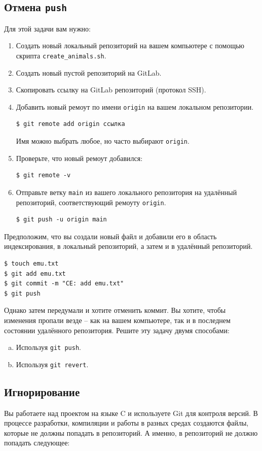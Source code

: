 \documentclass{article}
\begin{document}
\subsection{Отмена \texttt{push}}
Для этой задачи вам нужно:
\begin{enumerate}
\item Создать новый локальный репозиторий на вашем компьютере с помощью скрипта \texttt{create\_animals.sh}.
\item Создать новый пустой репозиторий на GitLab.
\item Скопировать ссылку на GitLab репозиторий (протокол SSH).
\item Добавить новый ремоут по имени \texttt{origin} на вашем локальном репозитории. 
\begin{lstlisting}[style=csMiptBash]
$ git remote add origin ссылка
\end{lstlisting}
Имя можно выбрать любое, но часто выбирают \texttt{origin}.
\item Проверьте, что новый ремоут добавился:
\begin{lstlisting}[style=csMiptBash]
$ git remote -v
\end{lstlisting}
\item Отправьте ветку \texttt{main} из вашего локального репозитория на удалённый репозиторий, соответствующий ремоуту \texttt{origin}.
\begin{lstlisting}[style=csMiptBash]
$ git push -u origin main
\end{lstlisting}
\end{enumerate}

\noindent Предположим, что вы создали новый файл и добавили его в область индексирования, в локальный репозиторий, а затем и в удалённый репозиторий.
\begin{lstlisting}[style=csMiptBash]
$ touch emu.txt
$ git add emu.txt
$ git commit -m "CE: add emu.txt"
$ git push
\end{lstlisting}
Однако затем передумали и хотите отменить коммит. Вы хотите, чтобы изменения пропали везде -- как на вашем компьютере, так и в последнем состоянии удалённого репозитория. Решите эту задачу двумя способами:
\begin{enumerate}[(a)]
\item Используя \texttt{git push}.
\item Используя \texttt{git revert}.
\end{enumerate}



\subsection{Игнорирование}
Вы работаете над проектом на языке C и используете Git для контроля версий. В процессе разработки, компиляции и работы в разных средах создаются файлы, которые не должны попадать в репозиторий. А именно, в репозиторий не должно попадать следующее:
\end{document}
